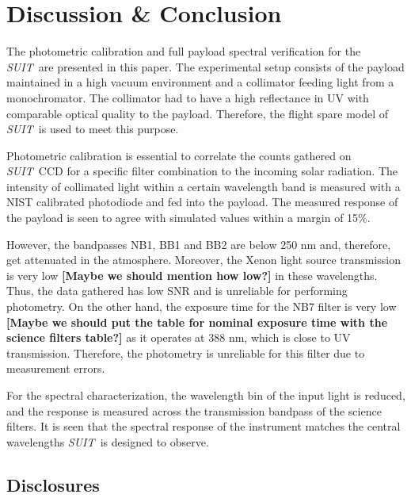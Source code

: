 \documentclass[12pt]{spieman}  %
\newcommand{\suit}{{\it SUIT~}}
\newcommand{\sr}[1]{{\bf\color{red} [#1]}}
\begin{document}
\section{Discussion \& Conclusion}\label{sec:conc}

The photometric calibration and full payload spectral verification for the \suit are presented in this paper. The experimental setup consists of the payload maintained in a high vacuum environment and a collimator feeding light from a monochromator. The collimator had to have a high reflectance in UV with comparable optical quality to the payload. Therefore, the flight spare model of \suit is used to meet this purpose.

Photometric calibration is essential to correlate the counts gathered on \suit CCD for a specific filter combination to the incoming solar radiation. The intensity of collimated light within a certain wavelength band is measured with a NIST calibrated photodiode and fed into the payload. The measured response of the payload is seen to agree with simulated values within a margin of 15\%. 

However, the bandpasses NB1, BB1 and BB2 are below 250 nm and, therefore, get attenuated in the atmosphere. Moreover, the Xenon light source transmission is very low \sr{Maybe we should mention how low?} in these wavelengths. Thus, the data gathered has low SNR and is unreliable for performing photometry. On the other hand, the exposure time for the NB7 filter is very low \sr{Maybe we should put the table for nominal exposure time with the science filters table?} as it operates at 388 nm, which is close to UV transmission. Therefore, the photometry is unreliable for this filter due to measurement errors.

For the spectral characterization, the wavelength bin of the input light is reduced, and the response is measured across the transmission bandpass of the science filters. It is seen that the spectral response of the instrument matches the central wavelengths \suit is designed to observe.



\subsection*{Disclosures}
\end{document}
